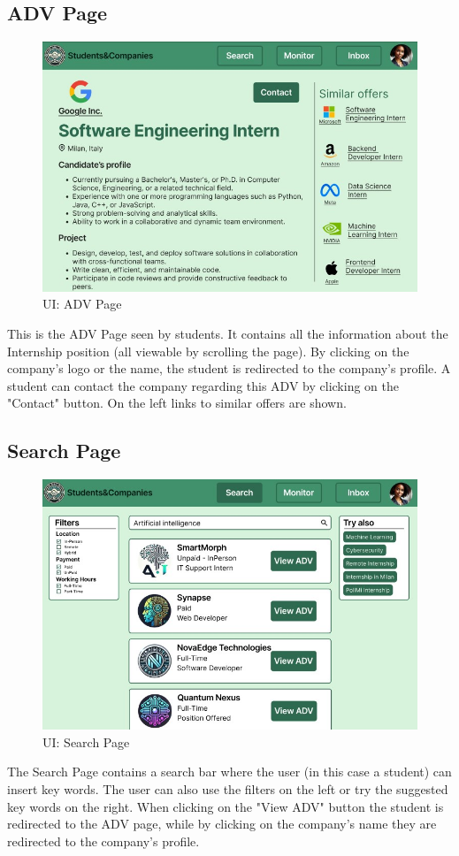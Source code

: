 \subsection{ADV Page}
\begin{figure}[H]
    \centering
    \includegraphics[width=15cm]{images/ui/advpage.jpg}
    \caption{UI: ADV Page}
\end{figure}
This is the ADV Page seen by students. It contains all the information about the Internship position (all viewable by scrolling the page). By clicking on the company's logo or the name, the student is redirected to the company's profile. A student can contact the company regarding this ADV by clicking on the "Contact" button. On the left links to similar offers are shown.

\subsection{Search Page}
\begin{figure}[H]
    \centering
    \includegraphics[width=15cm]{images/ui/search.jpg}
    \caption{UI: Search Page}
\end{figure}
The Search Page contains a search bar where the user (in this case a student) can insert key words. The user can also use the filters on the left or try the suggested key words on the right. When clicking on the "View ADV" button the student is redirected to the ADV page, while by clicking on the company's name they are redirected to the company's profile.

